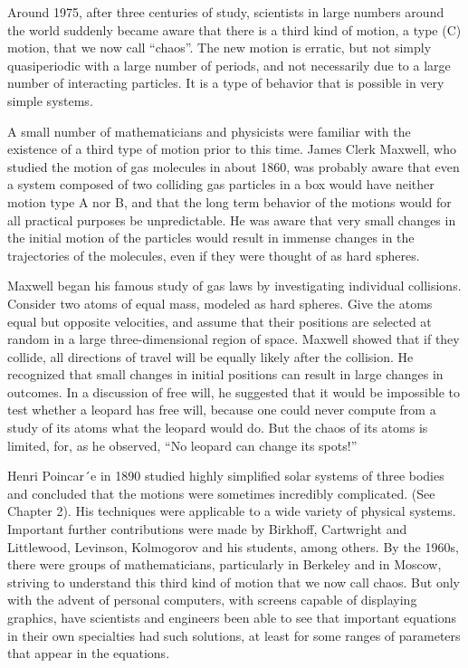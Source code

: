 Around 1975, after three centuries of study, scientists in large numbers around the world suddenly became 
aware that there is a third kind of motion, a type (C) motion, that we now call “chaos”. The new motion is 
erratic, but not simply quasiperiodic with a large number of periods, and not necessarily due to a large 
number of interacting particles. It is a type of behavior that is possible in very simple systems.

A small number of mathematicians and physicists were familiar with the existence of a third type of motion 
prior to this time. James Clerk Maxwell, who studied the motion of gas molecules in about 1860, was 
probably aware that even a system composed of two colliding gas particles in a box would have neither 
motion type A nor B, and that the long term behavior of the motions would for all practical purposes be 
unpredictable. He was aware that very small changes in the initial motion of the particles would result in 
immense changes in the trajectories of the molecules, even if they were thought of as hard spheres.

Maxwell began his famous study of gas laws by investigating individual collisions. Consider two atoms of 
equal mass, modeled as hard spheres. Give the atoms equal but opposite velocities, and assume that their 
positions are selected at random in a large three-dimensional region of space. Maxwell showed that if they 
collide, all directions of travel will be equally likely after the collision. He recognized that small 
changes in initial positions can result in large changes in outcomes. In a discussion of free will, he 
suggested that it would be impossible to test whether a leopard has free will, because one could never 
compute from a study of its atoms what the leopard would do. But the chaos of its atoms is limited, for, as 
he observed, “No leopard can change its spots!”

Henri Poincar´e in 1890 studied highly simpliﬁed solar systems of three bodies and concluded that the 
motions were sometimes incredibly complicated. (See Chapter 2). His techniques were applicable to a wide 
variety of physical systems. Important further contributions were made by Birkhoff, Cartwright and 
Littlewood, Levinson, Kolmogorov and his students, among others. By the 1960s, there were groups of 
mathematicians, particularly in Berkeley and in Moscow, striving to understand this third kind of motion 
that we now call chaos. But only with the advent of personal computers, with screens capable of displaying 
graphics, have scientists and engineers been able to see that important equations in their own specialties 
had such solutions, at least for some ranges of parameters that appear in the equations.

